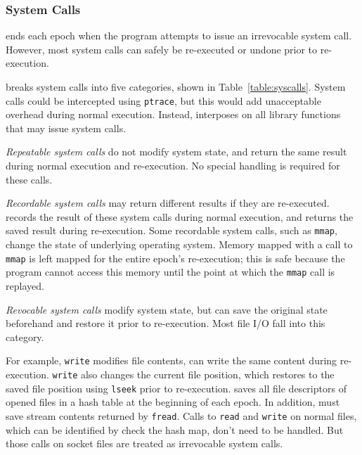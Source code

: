 
\subsubsection*{System Calls}
\label{sec:syscalls}


\doubletake{} ends each epoch when the program attempts to issue an irrevocable system call. However, most system calls can safely be re-executed or undone prior to re-execution. 

\doubletake{} breaks system calls into five categories, shown in Table~\ref{table:syscalls}. System calls could be intercepted using \texttt{ptrace}, but this would add unacceptable overhead during normal execution. Instead, \doubletake{} interposes on all library functions that may issue system calls.


\emph{Repeatable system calls} do not modify system state, and return the same result during normal execution and re-execution. No special handling is required for these calls.




\emph{Recordable system calls} may return different results if they are re-executed. \doubletake{} records the result of these system calls during normal execution, and returns the saved result during re-execution. Some recordable system calls, such as \texttt{mmap}, change the state of underlying operating system. Memory mapped with a call to \texttt{mmap} is left mapped for the entire epoch's re-execution; this is safe because the program cannot access this memory until the point at which the \texttt{mmap} call is replayed.

\emph{Revocable system calls} modify system state, but \doubletake{} can save the original state beforehand and restore it prior to re-execution. Most file I/O fall into this category.

For example, \texttt{write} modifies file contents, \doubletake{} can write the same content during re-execution. \texttt{write} also changes the current file position, which \doubletake{} restores to the saved file position using \texttt{lseek} prior to re-execution. \doubletake{} saves all file descriptors of opened files in a hash table at the beginning of each epoch. In addition, \doubletake{} must save stream contents returned by \texttt{fread}. Calls to \texttt{read} and \texttt{write}  on normal files, which can be identified by check the hash map, don't need to be handled. But those calls on socket files are treated as irrevocable system calls.
	
